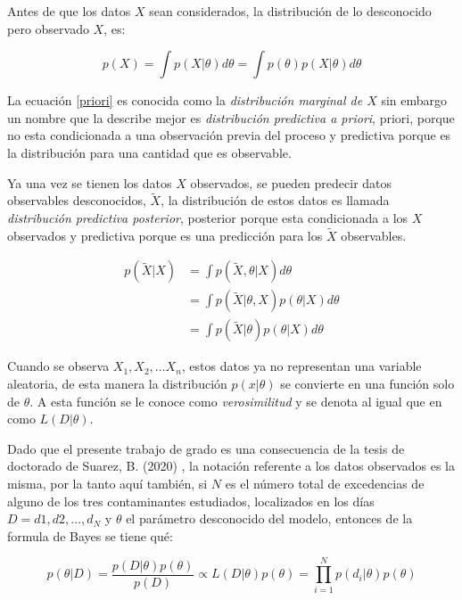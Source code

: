 Antes de que los datos $X$ sean considerados, la distribución de lo desconocido pero observado $X$, es: 

\begin{equation}
p(X)=\int p(X|\theta)d\theta=\int p(\theta)p(X|\theta)d\theta
\label{priori}
\end{equation}

La ecuación \ref{priori} es conocida como la \textit{distribución marginal de $X$} sin embargo un nombre que la describe mejor es \textit{distribución predictiva a priori}, priori, porque no esta condicionada a una observación previa del proceso y predictiva porque es la distribución para una cantidad que es observable. 

Ya una vez se tienen los datos $X$ observados, se pueden predecir datos observables desconocidos, $ \widetilde{X}$, la distribución de estos datos es llamada \textit{distribución predictiva posterior}, posterior porque esta condicionada a los $X$ observados y predictiva porque es una predicción para los $ \widetilde{X}$ observables. 

\begin{equation} \label{posterior}
\begin{split}
p(\widetilde{X}|X) & = \int p(\widetilde{X},\theta|X)d\theta \\
 & = \int p(\widetilde{X}|\theta,X)p(\theta|X)d\theta\\
 & = \int p(\widetilde{X}|\theta)p(\theta|X)d\theta
\end{split}
\end{equation}

Cuando se observa $X_1, X_2, \dots X_n$, estos datos ya no representan una variable aleatoria, de esta manera la distribución $p(x|\theta)$ se convierte en una función solo de $\theta$. A esta función se le conoce como \textit{verosimilitud} y se denota al igual que en \cite{tesisbiviana} como $L(D|\theta)$.

Dado que el presente trabajo de grado es una consecuencia de la tesis de doctorado de Suarez, B. (2020) \cite{tesisbiviana}, la notación referente a los datos observados es la misma, por la tanto aquí también, si $N$ es el número total de excedencias de alguno de los tres contaminantes estudiados, localizados en los días $D={d1, d2, \dots , d_N}$ y $\theta$ el parámetro desconocido del modelo, entonces de la formula de Bayes se tiene qué: 

\begin{equation}
\label{verosimilitud}
p(\theta|D)=\frac{p(D|\theta)p(\theta)}{p(D)}\propto L(D|\theta)p(\theta)=\prod_{i=1}^N p(d_i|\theta)p(\theta)
\end{equation} 


